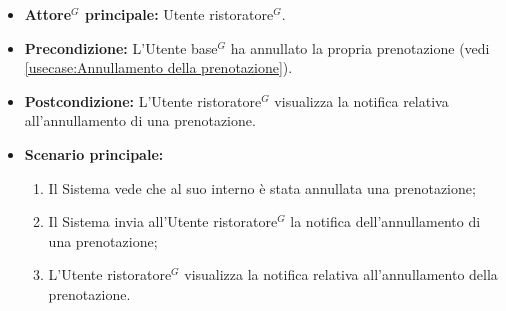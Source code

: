 \label{usecase:Visualizzazione notifica annullamento prenotazione}
\begin{itemize}
	\item \textbf{\gls{Attore}$^G$ principale:} \gls{Utente ristoratore}$^G$.

	\item \textbf{Precondizione:} L'\gls{Utente base}$^G$ ha annullato la propria prenotazione (vedi \autoref{usecase:Annullamento della prenotazione}).

	\item \textbf{Postcondizione:} L'\gls{Utente ristoratore}$^G$ visualizza la notifica relativa all'annullamento di una prenotazione.

	\item \textbf{Scenario principale:}
	      \begin{enumerate}
		      \item Il Sistema vede che al suo interno è stata annullata una prenotazione;
		      \item Il Sistema invia all'\gls{Utente ristoratore}$^G$ la notifica dell'annullamento di una prenotazione;
		      \item L'\gls{Utente ristoratore}$^G$ visualizza la notifica relativa all'annullamento della prenotazione.
	      \end{enumerate}
\end{itemize}
